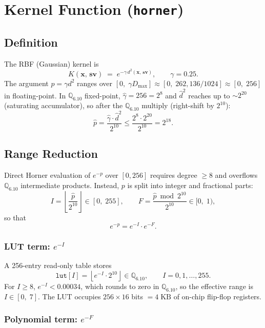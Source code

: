 \documentclass[11pt]{article}
\begin{document}
\section{Kernel Function (\texttt{horner})}

\subsection{Definition}

The RBF (Gaussian) kernel is
\[
    K(\mathbf{x},\, \mathbf{sv})
    \;=\;
    e^{-\gamma \, d^2(\mathbf{x},\, \mathbf{sv})},
    \qquad \gamma = 0.25.
\]
The argument \(p = \gamma d^2\) ranges over \([0,\; \gamma D_{\max}] \approx [0,\; 262{,}136 / 1024] \approx [0,\; 256]\)
in floating-point. In \(\mathbb{Q}_{6.10}\) fixed-point, \(\hat{\gamma} = 256 = 2^8\)
and \(\hat{d}^2\) reaches up to \(\sim 2^{20}\) (saturating accumulator), so after
the \(\mathbb{Q}_{6.10}\) multiply (right-shift by \(2^{10}\)):
\[
    \hat{p} = \frac{\hat{\gamma} \cdot \hat{d}^2}{2^{10}}
    \leq \frac{2^8 \cdot 2^{20}}{2^{10}} = 2^{18}.
\]

\subsection{Range Reduction}

Direct Horner evaluation of \(e^{-p}\) over \([0, 256]\) requires degree
\(\geq 8\) and overflows \(\mathbb{Q}_{6.10}\) intermediate products.
Instead, \(p\) is split into integer and fractional parts:
\[
    I = \left\lfloor \frac{\hat{p}}{2^{10}} \right\rfloor \in [0,\; 255],
    \qquad
    F = \frac{\hat{p} \bmod 2^{10}}{2^{10}} \in [0,\; 1),
\]
so that
\[
    e^{-p} = e^{-I} \cdot e^{-F}.
\]

\subsubsection*{LUT term: \(e^{-I}\)}

A 256-entry read-only table stores
\[
    \texttt{lut}[I] = \left\lfloor e^{-I} \cdot 2^{10} \right\rfloor
    \in \mathbb{Q}_{6.10}, \qquad I = 0, 1, \ldots, 255.
\]
For \(I \geq 8\), \(e^{-I} < 0.00034\), which rounds to zero in
\(\mathbb{Q}_{6.10}\), so the effective range is \(I \in [0,\; 7]\).
The LUT occupies \(256 \times 16\) bits \(= 4\;\text{KB}\) of on-chip
flip-flop registers.

\subsubsection*{Polynomial term: \(e^{-F}\)}
\end{document}
